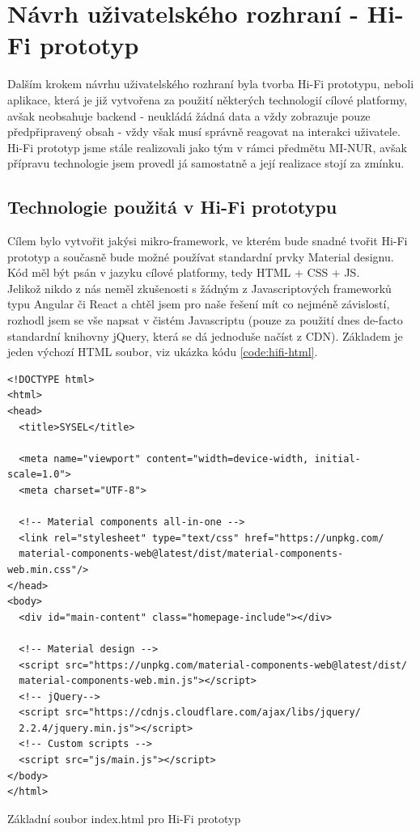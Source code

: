 \section{Návrh uživatelského rozhraní - Hi-Fi prototyp}

Dalším krokem návrhu uživatelského rozhraní byla tvorba Hi-Fi prototypu, neboli aplikace, která je již vytvořena za použití některých technologií cílové platformy, avšak neobsahuje backend - neukládá žádná data a vždy zobrazuje pouze předpřipravený obsah - vždy však musí správně reagovat na interakci uživatele.\\
Hi-Fi prototyp jsme stále realizovali jako tým v rámci předmětu MI-NUR, avšak přípravu technologie jsem provedl já samostatně a její realizace stojí za zmínku.


\subsection{Technologie použitá v Hi-Fi prototypu}

Cílem bylo vytvořit jakýsi mikro-framework, ve kterém bude snadné tvořit Hi-Fi prototyp a současně bude možné používat standardní prvky Material designu. Kód měl být psán v jazyku cílové platformy, tedy HTML + CSS + JS.\\
Jelikož nikdo z nás neměl zkušenosti s žádným z Javascriptových frameworků typu Angular či React a chtěl jsem pro naše řešení mít co nejméně závislostí, rozhodl jsem se vše napsat v čistém Javascriptu (pouze za použití dnes de-facto standardní knihovny jQuery, která se dá jednoduše načíst z CDN). Základem je jeden výchozí HTML soubor, viz ukázka kódu \ref{code:hifi-html}.

\begin{listing}[H]
\begin{verbatim}
<!DOCTYPE html>
<html>
<head>
  <title>SYSEL</title>

  <meta name="viewport" content="width=device-width, initial-scale=1.0">
  <meta charset="UTF-8">

  <!-- Material components all-in-one -->
  <link rel="stylesheet" type="text/css" href="https://unpkg.com/
  material-components-web@latest/dist/material-components-web.min.css"/>
</head>
<body>
  <div id="main-content" class="homepage-include"></div>

  <!-- Material design -->
  <script src="https://unpkg.com/material-components-web@latest/dist/
  material-components-web.min.js"></script>
  <!-- jQuery-->
  <script src="https://cdnjs.cloudflare.com/ajax/libs/jquery/
  2.2.4/jquery.min.js"></script>
  <!-- Custom scripts -->
  <script src="js/main.js"></script>
</body>
</html>
\end{verbatim}
\caption{Základní soubor index.html pro Hi-Fi prototyp} \label{code:hifi-html}
\end{listing}


